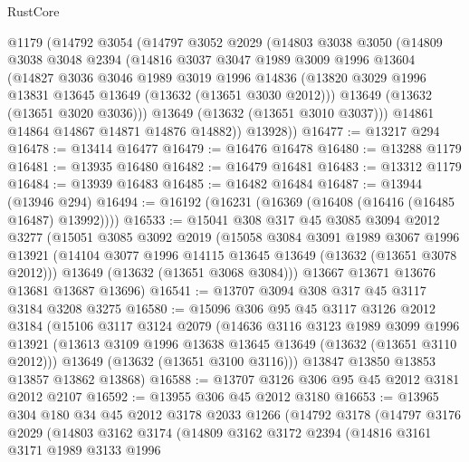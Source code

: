 \begin{lexlean}{RustCore}
\begin{coremodule}
    @1179
    (@14792
      @3054
      (@14797
        @3052
        @2029
        (@14803
          @3038
          @3050
          (@14809
            @3038
            @3048
            @2394
            (@14816
              @3037
              @3047
              @1989
              @3009
              @1996
              @13604
              (@14827
                @3036
                @3046
                @1989
                @3019
                @1996
                @14836
                (@13820 @3029 @1996 @13831 @13645 @13649 (@13632 (@13651 @3030 @2012)))
                @13649
                (@13632 (@13651 @3020 @3036)))
              @13649
              (@13632 (@13651 @3010 @3037)))
            @14861
            @14864
            @14867
            @14871
            @14876
            @14882))
        @13928))
@16477 := @13217 @294
@16478 := @13414 @16477
@16479 := @16476 @16478
@16480 := @13288 @1179
@16481 := @13935 @16480
@16482 := @16479 @16481
@16483 := @13312 @1179
@16484 := @13939 @16483
@16485 := @16482 @16484
@16487 := @13944 (@13946 @294)
@16494 := @16192 (@16231 (@16369 (@16408 (@16416 (@16485 @16487) @13992))))
@16533 := @15041
    @308
    @317
    @45
    @3085
    @3094
    @2012
    @3277
    (@15051
      @3085
      @3092
      @2019
      (@15058
        @3084
        @3091
        @1989
        @3067
        @1996
        @13921
        (@14104 @3077 @1996 @14115 @13645 @13649 (@13632 (@13651 @3078 @2012)))
        @13649
        (@13632 (@13651 @3068 @3084)))
      @13667
      @13671
      @13676
      @13681
      @13687
      @13696)
@16541 := @13707 @3094 @308 @317 @45 @3117 @3184 @3208 @3275
@16580 := @15096
    @306
    @95
    @45
    @3117
    @3126
    @2012
    @3184
    (@15106
      @3117
      @3124
      @2079
      (@14636
        @3116
        @3123
        @1989
        @3099
        @1996
        @13921
        (@13613 @3109 @1996 @13638 @13645 @13649 (@13632 (@13651 @3110 @2012)))
        @13649
        (@13632 (@13651 @3100 @3116)))
      @13847
      @13850
      @13853
      @13857
      @13862
      @13868)
@16588 := @13707 @3126 @306 @95 @45 @2012 @3181 @2012 @2107
@16592 := @13955 @306 @45 @2012 @3180
@16653 := @13965
    @304
    @180
    @34
    @45
    @2012
    @3178
    @2033
    @1266
    (@14792
      @3178
      (@14797
        @3176
        @2029
        (@14803
          @3162
          @3174
          (@14809
            @3162
            @3172
            @2394
            (@14816
              @3161
              @3171
              @1989
              @3133
              @1996

\end{coremodule}
\end{lexlean}
